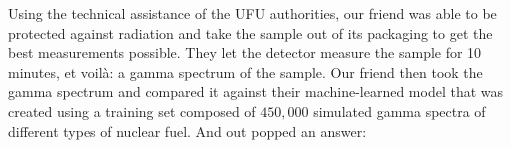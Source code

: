 {{\begin{minipage}[t]{0.45\textwidth}
    Using the technical assistance of the UFU authorities, our friend
    was able to be protected against radiation and take the sample out of its
    packaging to get the best measurements possible. They let the detector
    measure the sample for 10 minutes, et voil\`{a}: a gamma spectrum of the
    sample. Our friend then took the gamma spectrum and compared it against
    their machine-learned model that was created using a training set composed
    of $450,000$ simulated gamma spectra of different types of nuclear fuel.
    And out popped an answer:
  
  \end{minipage}%
}
  \hfill\vline\hfill
\noindent {}}
